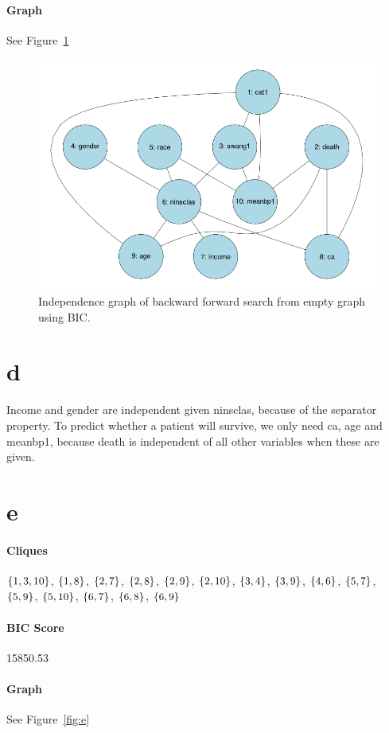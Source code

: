 \documentclass[12pt]{article}
\theoremstyle{definition}
\begin{document}
\paragraph{Graph} See Figure~\ref{fig:c}

\begin{figure}[H]
    \centering
    \includegraphics[width=0.8\linewidth]{c.png}
    \caption{Independence graph of backward forward search from empty graph using BIC.}
\label{fig:c}
\end{figure}

\section*{d}
Income and gender are independent given ninsclas, because of the separator property.
To predict whether a patient will survive, we only need ca, age and meanbp1, because
death is independent of all other variables when these are given.

\section*{e}
\paragraph{Cliques}
$\set{1,3,10}$, $\set{1,8}$, $\set{2,7}$, $\set{2,8}$, $\set{2,9}$, $\set{2,10}$,
$\set{3,4}$, $\set{3,9}$, $\set{4,6}$, $\set{5,7}$, $\set{5,9}$, $\set{5,10}$,
$\set{6,7}$, $\set{6,8}$, $\set{6,9}$

\paragraph{BIC Score} 15850.53

\paragraph{Graph} See Figure~\ref{fig:e}
\end{document}
